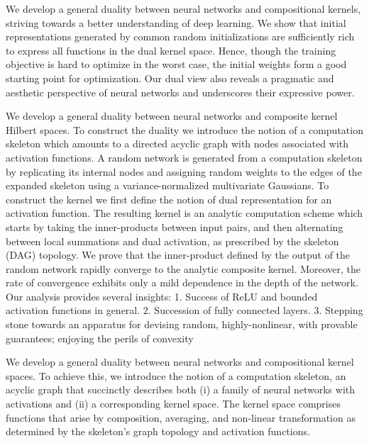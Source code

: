 We develop a general duality between neural networks and compositional kernels,
striving towards a better understanding of deep learning. We show that initial
representations generated by common random initializations are sufficiently
rich to express all functions in the dual kernel space. Hence, though the
training objective is hard to optimize in the worst case, the initial
weights form a good starting point for optimization. Our dual view also
reveals a pragmatic and aesthetic perspective of neural networks and
underscores their expressive power.

\iffalse
We develop a general duality between neural networks and composite kernel
Hilbert spaces. To construct the duality we introduce the notion of a
computation skeleton which amounts to a directed acyclic graph with nodes
associated with activation functions. A random network is generated from a
computation skeleton by replicating its internal nodes and assigning random
weights to the edges of the expanded skeleton using a variance-normalized
multivariate Gaussians. To construct the kernel we first define the notion of
dual representation for an activation function. The resulting kernel is an
analytic computation scheme which starts by taking the inner-products between
input pairs, and then alternating between local summations and dual
activation, as prescribed by the skeleton (DAG) topology. We prove that the
inner-product defined by the output of the random network rapidly converge to
the analytic composite kernel. Moreover, the rate of convergence exhibits only
a mild dependence in the depth of the network. Our analysis provides several
insights:
1. Success of ReLU and bounded activation functions in general.
2. Succession of fully connected layers.
3. Stepping stone towards an apparatus for devising random, highly-nonlinear,
   with provable guarantees; enjoying the perils of convexity

We develop a general duality between neural networks and compositional
kernel spaces.
%
To achieve this, we introduce the notion of a computation
skeleton, an acyclic graph that succinctly describes both (i) a
family of neural networks with activations and (ii) a corresponding
kernel space. The kernel space comprises functions that arise by
composition, averaging, and non-linear transformation as determined by
the skeleton's graph topology and activation functions.

